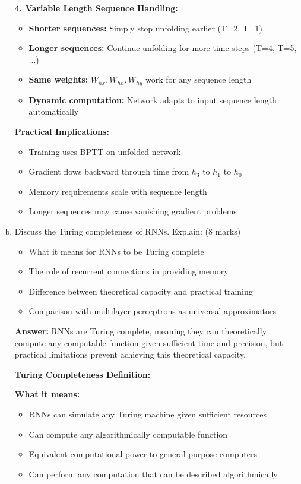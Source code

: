 \documentclass[12pt]{article}
\newcommand{\answer}[1]{{\color{answercolor}\textbf{Answer:} #1}}
\newcommand{\explanation}[1]{{\color{explanationcolor}#1}}
\begin{document}
\begin{enumerate}[(a)]
{    \textbf{4. Variable Length Sequence Handling:}
    \begin{itemize}
        \item \textbf{Shorter sequences:} Simply stop unfolding earlier (T=2, T=1)
        \item \textbf{Longer sequences:} Continue unfolding for more time steps (T=4, T=5, ...)
        \item \textbf{Same weights:} $W_{hx}, W_{hh}, W_{hy}$ work for any sequence length
        \item \textbf{Dynamic computation:} Network adapts to input sequence length automatically
    \end{itemize}
    
    \textbf{Practical Implications:}
    \begin{itemize}
        \item Training uses BPTT on unfolded network
        \item Gradient flows backward through time from $h_3$ to $h_1$ to $h_0$
        \item Memory requirements scale with sequence length
        \item Longer sequences may cause vanishing gradient problems
    \end{itemize}
    }
    
    \item Discuss the Turing completeness of RNNs. Explain: \hfill (8 marks)
    \begin{itemize}
        \item What it means for RNNs to be Turing complete
        \item The role of recurrent connections in providing memory
        \item Difference between theoretical capacity and practical training
        \item Comparison with multilayer perceptrons as universal approximators
    \end{itemize}
    
    \answer{RNNs are Turing complete, meaning they can theoretically compute any computable function given sufficient time and precision, but practical limitations prevent achieving this theoretical capacity.}
    
    \explanation{
    \textbf{Turing Completeness Definition:}
    
    \textbf{What it means:}
    \begin{itemize}
        \item RNNs can simulate any Turing machine given sufficient resources
        \item Can compute any algorithmically computable function
        \item Equivalent computational power to general-purpose computers
        \item Can perform any computation that can be described algorithmically
    \end{itemize}
    
}
\end{enumerate}
\end{document}
